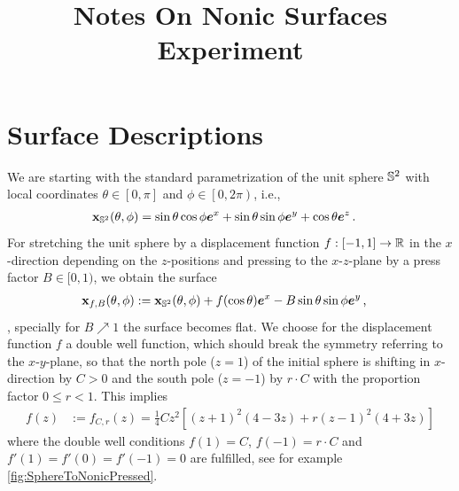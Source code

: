 \documentclass[a4paper,11pt]{scrartcl}
\title{Notes On Nonic Surfaces Experiment}
\newcommand{\EuBase}[1]{\eb^{#1}}
\newcommand{\pstretch}{C}
\newcommand{\pprop}{r}
\newcommand{\ppress}{B}
\begin{document}
\maketitle

\section{Surface Descriptions}
We are starting with the standard parametrization of the unit sphere \( \mathbb{S}^2 \)
with local coordinates \(  \theta\in\left[ 0,\pi \right]\) and \( \phi\in\left[ 0,2\pi\right) \), i.e.,
\begin{align}
      \Xb_{\Sp}(\theta,\phi) &= 
                      \sin\theta\cos\phi\EuBase{x} +  \sin\theta\sin\phi \EuBase{y} + \cos\theta\EuBase{z} \formPeriod
\end{align}
For stretching the unit sphere by a displacement function \( f:[-1,1] \rightarrow \mathbb{R} \) in the \( x \)-direction depending on the \( z
\)-positions 
and pressing to the \( x \)-\( z \)-plane by a press factor \( \ppress\in [0,1) \),
we obtain the surface
\begin{align}
  \Xb_{f,\ppress}(\theta,\phi) &:= \Xb_{\Sp}(\theta,\phi) + f(\cos\theta)\EuBase{x} - B\sin\theta\sin\phi\EuBase{y} \formComma
\end{align}
\ie, specially for \( \ppress\nearrow 1 \) the surface becomes flat.
We choose for the displacement function \( f \) a double well function,
which should break the symmetry referring to the \( x \)-\( y \)-plane,
so that the north pole (\( z=1 \)) of the initial sphere is shifting in  \( x \)-direction by \( \pstretch>0 \)
and the south pole (\( z=-1 \)) by \( \pprop\cdot\pstretch  \) with the proportion factor \( 0 \le \pprop < 1 \).
This implies
\begin{align}
  f(z) &:= f_{\pstretch,\pprop}(z) = \frac{1}{4} \pstretch z^2 \left[(z+1)^2 (4-3 z)+\pprop (z-1)^2 (4+3 z)\right]
\end{align}
where the double well conditions \( f(1) = \pstretch \), \( f(-1)=\pprop\cdot\pstretch \) and \( f'(1)=f'(0)=f'(-1)=0 \) are fulfilled,
see for example \autoref{fig:SphereToNonicPressed}.
\end{document}
